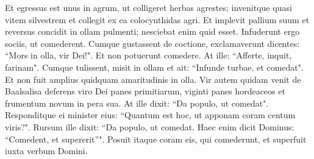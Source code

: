 \begin{biblechapter}
\verse Et egressus est unus in agrum, ut colligeret herbas agrestes; invenitque quasi vitem silvestrem et collegit ex ea colocynthidas agri. Et implevit pallium suum et reversus concidit in ollam pulmenti; nesciebat enim quid esset. 
\verse Infuderunt ergo sociis, ut comederent. Cumque gustassent de coctione, exclamaverunt dicentes: “Mors in olla, vir Dei!". Et non potuerunt comedere. 
\verse At ille: “Afferte, inquit, farinam". Cumque tulissent, misit in ollam et ait: “Infunde turbae, et comedat". Et non fuit amplius quidquam amaritudinis in olla. 
\verse Vir autem quidam venit de Baalsalisa deferens viro Dei panes primitiarum, viginti panes hordeaceos et frumentum novum in pera sua. At ille dixit: “Da populo, ut comedat". 
\verse Responditque ei minister eius: “Quantum est hoc, ut apponam coram centum viris?". Rursum ille dixit: “Da populo, ut comedat. Haec enim dicit Dominus: “Comedent, et supererit”". 
\verse Posuit itaque coram eis, qui comederunt, et superfuit iuxta verbum Domini. 
\end{biblechapter}

